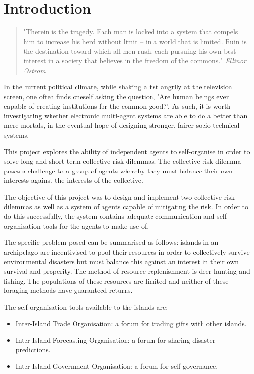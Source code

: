 \chapter{Introduction}

\begin{flushleft}
\begin{quote}
    "Therein is the tragedy. Each man is locked into a system that compels him to increase his herd without limit – in a world that is limited. Ruin is the destination toward which all men rush, each pursuing his own best interest in a society that believes in the freedom of the commons."
    \linebreak
    \emph{Ellinor Ostrom}
\end{quote}
\end{flushleft}

In the current political climate, while shaking a fist angrily at the television screen, one often finds oneself asking the question, 'Are human beings even capable of creating institutions for the common good?'. As such, it is worth investigating whether electronic multi-agent systems are able to do a better than mere mortals, in the eventual hope of designing stronger, fairer socio-technical systems.

This project explores the ability of independent agents to self-organise in order to solve long and short-term collective risk dilemmas. The collective risk dilemma poses a challenge to a group of agents whereby they must balance their own interests against the interests of the collective. 

The objective of this project was to design and implement two collective risk dilemmas as well as a system of agents capable of mitigating the risk. In order to do this successfully, the system contains adequate communication and self-organisation tools for the agents to make use of.

The specific problem posed can be summarised as follows: islands in an archipelago are incentivised to pool their resources in order to collectively survive environmental disasters but must balance this against an interest in their own survival and properity. The method of resource replenishment is deer hunting and fishing. The populations of these resources are limited and neither of these foraging methods have guaranteed returns. 

The self-organisation tools available to the islands are:

\begin{itemize}
    \item Inter-Island Trade Organisation: a forum for trading gifts with other islands.
    \item Inter-Island Forecasting Organisation: a forum for sharing disaster predictions.
    \item Inter-Island Government Organisation: a forum for self-governance.
\end{itemize}
